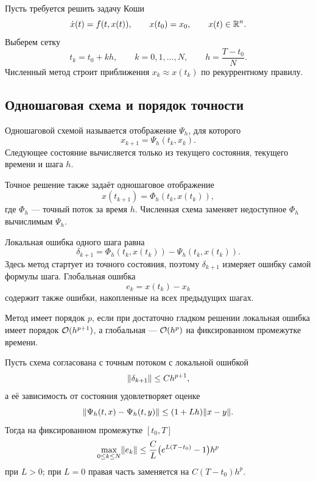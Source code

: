 Пусть требуется решить задачу Коши
\begin{equation}
\label{eq:ivp-for-numerical-integration-v04}
\dot x(t)=f(t,x(t)),
\qquad
x(t_0)=x_0,
\qquad
x(t)\in\mathbb{R}^n.
\end{equation}
Выберем сетку
\[
t_k=t_0+kh,
\qquad
k=0,1,\ldots,N,
\qquad
h=\frac{T-t_0}{N}.
\]
Численный метод строит приближения $x_k\approx x(t_k)$ по рекуррентному правилу.

\subsection{Одношаговая схема и порядок точности}

\begin{definition}
\label{def:one-step-method-v04}
Одношаговой схемой называется отображение $\Psi_h$, для которого
\begin{equation}
\label{eq:one-step-method-v04}
x_{k+1}=\Psi_h(t_k,x_k).
\end{equation}
Следующее состояние вычисляется только из текущего состояния, текущего времени и шага $h$.
\end{definition}

Точное решение также задаёт одношаговое отображение
\[
x(t_{k+1})=\Phi_h(t_k,x(t_k)),
\]
где $\Phi_h$ --- точный поток за время $h$. Численная схема заменяет недоступное $\Phi_h$ вычислимым $\Psi_h$.

\begin{definition}
\label{def:local-global-error-v04}
Локальная ошибка одного шага равна
\begin{equation}
\label{eq:local-defect-v04}
\delta_{k+1}
=
\Phi_h(t_k,x(t_k))
-
\Psi_h(t_k,x(t_k)).
\end{equation}
Здесь метод стартует из точного состояния, поэтому $\delta_{k+1}$ измеряет ошибку самой формулы шага. Глобальная ошибка
\begin{equation}
\label{eq:global-error-v04}
e_k=x(t_k)-x_k
\end{equation}
содержит также ошибки, накопленные на всех предыдущих шагах.
\end{definition}

Метод имеет порядок $p$, если при достаточно гладком решении локальная ошибка имеет порядок $\mathcal{O}(h^{p+1})$, а глобальная --- $\mathcal{O}(h^p)$ на фиксированном промежутке времени.

\begin{theorem}
\label{thm:local-to-global-error-v04}
Пусть схема согласована с точным потоком с локальной ошибкой
\[
\lVert\delta_{k+1}\rVert
\leq Ch^{p+1},
\]
а её зависимость от состояния удовлетворяет оценке
\[
\lVert\Psi_h(t,x)-\Psi_h(t,y)\rVert
\leq
(1+Lh)\lVert x-y\rVert.
\]
Тогда на фиксированном промежутке $[t_0,T]$
\begin{equation}
\label{eq:global-order-bound-v04}
\max_{0\leq k\leq N}\lVert e_k\rVert
\leq
\frac{C}{L}\bigl(e^{L(T-t_0)}-1\bigr)h^p
\end{equation}
при $L>0$; при $L=0$ правая часть заменяется на $C(T-t_0)h^p$.
\end{theorem}


